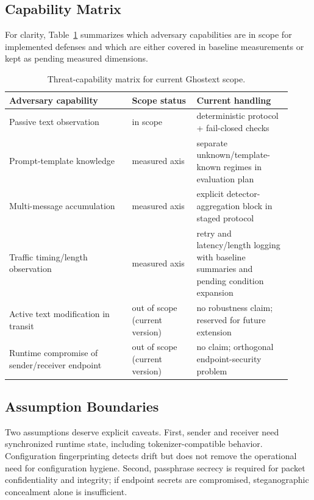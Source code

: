 \subsection{Capability Matrix}

For clarity, Table~\ref{tab:threat-capabilities} summarizes which adversary capabilities are in scope for implemented defenses and which are either covered in baseline measurements or kept as pending measured dimensions.

\begin{table}[t]
\caption{Threat-capability matrix for current Ghostext scope.}
\label{tab:threat-capabilities}
\begin{tabular}{p{0.40\linewidth}p{0.21\linewidth}p{0.31\linewidth}}
\toprule
Adversary capability & Scope status & Current handling \\
\midrule
Passive text observation & in scope & deterministic protocol + fail-closed checks \\
Prompt-template knowledge & measured axis & separate unknown/template-known regimes in evaluation plan \\
Multi-message accumulation & measured axis & explicit detector-aggregation block in staged protocol \\
Traffic timing/length observation & measured axis & retry and latency/length logging with baseline summaries and pending condition expansion \\
Active text modification in transit & out of scope (current version) & no robustness claim; reserved for future extension \\
Runtime compromise of sender/receiver endpoint & out of scope (current version) & no claim; orthogonal endpoint-security problem \\
\bottomrule
\end{tabular}
\end{table}

\subsection{Assumption Boundaries}

Two assumptions deserve explicit caveats. First, sender and receiver need synchronized runtime state, including tokenizer-compatible behavior. Configuration fingerprinting detects drift but does not remove the operational need for configuration hygiene. Second, passphrase secrecy is required for packet confidentiality and integrity; if endpoint secrets are compromised, steganographic concealment alone is insufficient.

